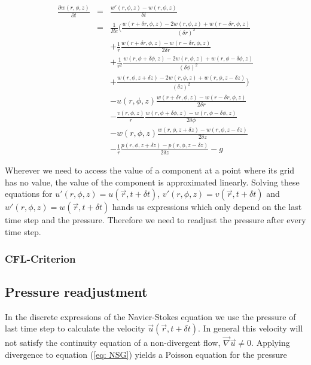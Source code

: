 \documentclass[12pt, a4paper, twoside]{article}
\begin{document}
		\begin{eqnarray}
			\frac{\partial w(r,\phi,z)}{\partial t} &=& \frac{w'(r,\phi,z)- w(r,\phi,z)}{\delta t}
			\nonumber \\
			&=& \frac{1}{Re} \bigg( \frac{w(r+\delta r,\phi,z)-2w(r,\phi,z)+w(r-\delta r,\phi,z)}{(\delta r)^2}
			\nonumber \\
							&&	+ \frac{1}{r}\frac{w(r+\delta r,\phi,z)-w(r-\delta r,\phi,z)}{2\delta r}
			\nonumber \\
							&&	+ \frac{1}{r^2}\frac{w(r,\phi+\delta\phi,z)-2w(r,\phi,z)+w(r,\phi-\delta\phi,z)}{(\delta \phi)^2}
			\nonumber \\
							&&	+ \frac{w(r,\phi,z+\delta z)-2w(r,\phi,z)+w(r,\phi,z-\delta z)}{(\delta z)^2} \bigg)
			\nonumber \\
			&&	- u(r,\phi,z)\frac{w(r+\delta r,\phi,z)-w(r-\delta r,\phi,z)}{2\delta r}
			\nonumber \\
			&&	- \frac{v(r,\phi,z)}{r}\frac{w(r,\phi+\delta\phi,z)-w(r,\phi-\delta\phi,z)}{2\delta\phi}
			\nonumber \\
			&&	- w(r,\phi,z)\frac{w(r,\phi,z+\delta z)-w(r,\phi,z-\delta z)}{2\delta z}
			\nonumber \\
			&&	- \frac{1}{r}\frac{p(r,\phi,z+\delta z)-p(r,\phi,z-\delta z)}{2\delta z}
				- g
			\label{eq:discrete w}
		\end{eqnarray}
		
		Wherever we need to access the value of a component at a point where its grid has no value, the value of the component is approximated linearly. Solving these equations for $u'(r,\phi,z) = u(\vec{r}, t+\delta t)$, $v'(r,\phi,z) = v(\vec{r}, t+\delta t)$ and $w'(r,\phi,z) = w(\vec{r}, t+\delta t)$ hands us expressions which only depend on the last time step and the pressure. Therefore we need to readjust the pressure after every time step.
		
		\subsubsection{CFL-Criterion}
		
	\subsection{Pressure readjustment}
		In the discrete expressions of the Navier-Stokes equation we use the pressure of last time step to calculate the velocity $\vec{u}(\vec{r},t+\delta t)$. In general this velocity will not satisfy the continuity equation of a non-divergent flow, $\vec{\nabla} \vec{u} \neq 0$. Applying divergence to equation (\ref{eq: NSG}) yields a Poisson equation for the pressure
		
\end{document}
